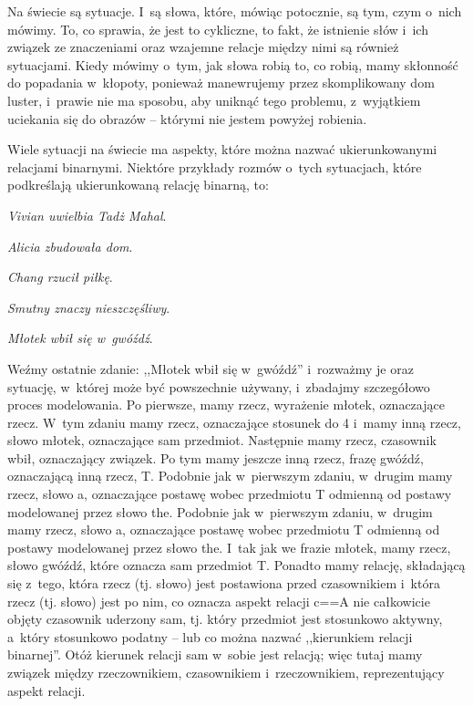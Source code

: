 \documentclass[oneside,polish,11pt,rmheadings]{mwbk}
\begin{document}
Na świecie są sytuacje. I~są słowa, które, mówiąc potocznie, są tym, czym o~nich mówimy. To, co sprawia, że jest to cykliczne, to fakt, że istnienie słów i~ich związek ze znaczeniami oraz wzajemne relacje między nimi są również sytuacjami. Kiedy mówimy o~tym, jak słowa robią to, co robią, mamy skłonność do popadania w~kłopoty, ponieważ manewrujemy przez skomplikowany dom luster, i~prawie nie ma sposobu, aby uniknąć tego problemu, z~wyjątkiem uciekania się do obrazów -- którymi nie jestem powyżej robienia. 

Wiele sytuacji na świecie ma aspekty, które można nazwać ukierunkowanymi relacjami binarnymi. Niektóre przykłady rozmów o~tych sytuacjach, które podkreślają ukierunkowaną relację binarną, to: 

\noindent \textit{Vivian uwielbia Tadż Mahal}.

\noindent \textit{Alicia zbudowała dom}. 

\noindent  \textit{Chang rzucił piłkę}. 

\noindent \textit{Smutny znaczy nieszczęśliwy}. 

\noindent \textit{Młotek wbił się w~gwóźdź}. 

Weźmy ostatnie zdanie: ,,Młotek wbił się w~gwóźdź'' i~rozważmy je oraz sytuację, w~której może być powszechnie używany, i~zbadajmy szczegółowo proces modelowania. Po pierwsze, mamy rzecz, wyrażenie młotek, oznaczające rzecz. W~tym zdaniu mamy rzecz, oznaczające stosunek do 4 i~mamy inną rzecz, słowo młotek, oznaczające sam przedmiot. Następnie mamy rzecz, czasownik wbił, oznaczający związek. Po tym mamy jeszcze inną rzecz, frazę gwóźdź, oznaczającą inną rzecz, T. Podobnie jak w~pierwszym zdaniu, w~drugim mamy rzecz, słowo a, oznaczające postawę wobec przedmiotu T odmienną od postawy modelowanej przez słowo the. Podobnie jak w~pierwszym zdaniu, w~drugim mamy rzecz, słowo a, oznaczające postawę wobec przedmiotu T odmienną od postawy modelowanej przez słowo the. I~tak jak we frazie młotek, mamy rzecz, słowo gwóźdź, które oznacza sam przedmiot T. Ponadto mamy relację, składającą się z~tego, która rzecz (tj. słowo) jest postawiona przed czasownikiem i~która rzecz (tj. słowo) jest po nim, co oznacza aspekt relacji c==A nie całkowicie objęty czasownik uderzony sam, tj. który przedmiot jest stosunkowo aktywny, a~który stosunkowo podatny -- lub co można nazwać ,,kierunkiem relacji binarnej''. Otóż kierunek relacji sam w~sobie jest relacją; więc tutaj mamy związek między rzeczownikiem, czasownikiem i~rzeczownikiem, reprezentujący aspekt relacji. 
\end{document}
